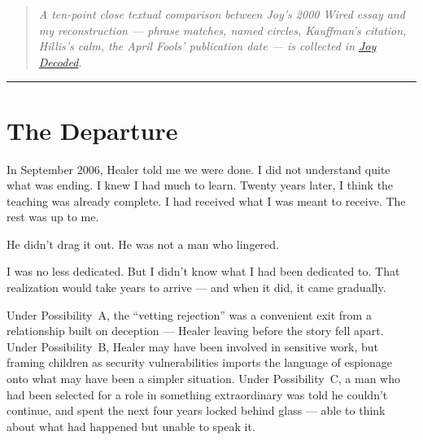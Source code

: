 \begin{quote}
\textit{A ten-point close textual comparison between Joy's 2000 \textit{Wired} essay and my reconstruction --- phrase matches, named circles, Kauffman's citation, Hillis's calm, the April Fools' publication date --- is collected in \hyperref[app:joy-ten-point]{Joy Decoded}.}
\end{quote}

\vspace{1cm}\noindent\rule{0.5\textwidth}{0.5pt}\vspace{0.5cm}

\section*{The Departure}


In September 2006, Healer told me we were done. I did not understand quite what was ending. I knew I had much to learn. Twenty years later, I think the teaching was already complete. I had received what I was meant to receive. The rest was up to me.

He didn't drag it out. He was not a man who lingered.

I was no less dedicated. But I didn't know what I had been dedicated to. That realization would take years to arrive --- and when it did, it came gradually.

Under Possibility~A, the ``vetting rejection'' was a convenient exit from a relationship built on deception --- Healer leaving before the story fell apart. Under Possibility~B, Healer may have been involved in sensitive work, but framing children as security vulnerabilities imports the language of espionage onto what may have been a simpler situation. Under Possibility~C, a man who had been selected for a role in something extraordinary was told he couldn't continue, and spent the next four years locked behind glass --- able to think about what had happened but unable to speak it.

\chapterreturn
